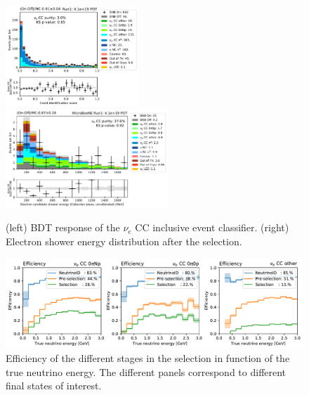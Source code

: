 

\begin{figure}
    \centering
    \includegraphics[width=0.445\textwidth]{NueCCsel/Images/run1/pre_event_score.pdf}
    \includegraphics[width=0.545\textwidth]{NueCCsel/Images/run1/nue_shower_energy_y.pdf}
    \caption{(left) BDT response of the $\nu_e$ CC inclusive event classifier. (right) Electron shower energy distribution after the selection.}
    \label{fig:pre_event_score}
\end{figure}

\begin{figure}
    \centering
    \includegraphics[width=\textwidth]{NueCCsel/Images/run1/efficiency_cat_2.pdf}
    \caption{Efficiency of the different stages in the selection in function of the true neutrino energy. The different panels correspond to different final states of interest.}
    \label{fig:nueccinc_eff}
\end{figure}

